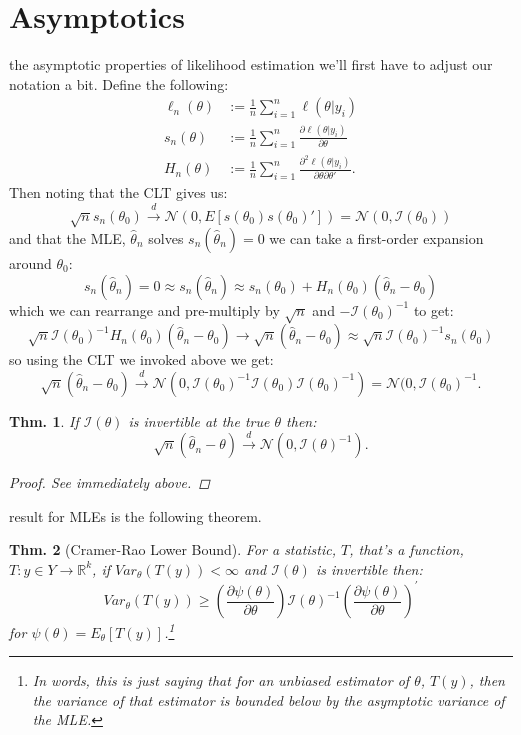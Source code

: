 \documentclass{tufte-book}
\theoremstyle{mytheoremstyle}
\newtheorem*{thm}{Thm.}
\theoremstyle{mylemstyle}
\theoremstyle{mydefstyle}
\begin{document}
\section{Asymptotics}
 the asymptotic properties of likelihood estimation we'll first have to adjust our notation a bit. Define the following:
	\begin{align*}
		\ell_n(\theta)& := \frac{1}{n} \sum_{i=1}^n \ell(\theta | y_i) \\
		s_n(\theta)& := \frac{1}{n} \sum_{i=1}^n \frac{\partial \ell(\theta | y_i)}{\partial \theta} \\
		H_n(\theta)& := \frac{1}{n} \sum_{i=1}^n \frac{\partial^2 \ell(\theta | y_i)}{\partial \theta \partial \theta'} \text{.}
	\end{align*}
Then noting that the CLT gives us:
	\[\sqrt{n}s_n(\theta_0) \overset{d}{\rightarrow} \mathcal{N}(0, E[s(\theta_0)s(\theta_0)']) = \mathcal{N}(0, \mathcal{I}(\theta_0))\]
and that the MLE, \(\hat{\theta}_n\) solves \(s_n(\hat{\theta}_n) = 0\) we can take a first-order expansion around \(\theta_0\):
	\[s_n(\hat{\theta}_n) = 0 \approx s_n(\hat{\theta}_n) \approx s_n(\theta_0) + H_n(\theta_0)(\hat{\theta}_n - \theta_0)\]
which we can rearrange and pre-multiply by \(\sqrt{n}\) and \(-\mathcal{I}(\theta_0)^{-1}\) to get:
	\[\sqrt{n}\mathcal{I}(\theta_0)^{-1}H_n(\theta_0)(\hat{\theta}_n - \theta_0)\rightarrow \sqrt{n}(\hat{\theta}_n - \theta_0) \approx \sqrt{n}\mathcal{I}(\theta_0)^{-1}s_n(\theta_0) \]
so using the CLT we invoked above we get:
	\[\sqrt{n}(\hat{\theta}_n - \theta_0) \overset{d}{\rightarrow} \mathcal{N}(0, \mathcal{I}(\theta_0)^{-1}\mathcal{I}(\theta_0)\mathcal{I}(\theta_0)^{-1}) = \mathcal{N}(0, \mathcal{I}(\theta_0)^{-1} \text{.}\]
\begin{thm} If \(\mathcal{I}(\theta)\) is invertible at the true \(\theta\) then:
	\[\sqrt{n}(\hat{\theta}_n - \theta) \overset{d}{\rightarrow} \mathcal{N}(0, \mathcal{I}(\theta)^{-1}) \text{.}\]
	\begin{proof} See immediately above.
	\end{proof}
\end{thm}

 result for MLEs is the following theorem.
\begin{thm}[Cramer-Rao Lower Bound] For a statistic, \(T\), that's a function, \(T: y\in Y \rightarrow \mathbb{R}^k\), if \(Var_\theta (T(y)) < \infty\) and \(\mathcal{I}(\theta)\) is invertible then:
	\[Var_\theta (T(y)) \ge \left(\frac{\partial \psi(\theta)}{\partial \theta} \right) \mathcal{I}(\theta)^{-1} \left(\frac{\partial \psi(\theta)}{\partial \theta}\right)^{'}\]
for \(\psi(\theta) = E_\theta[T(y)]\).\footnote{In words, this is just saying that for an unbiased estimator of \(\theta\), \(T(y)\), then the variance of that estimator is bounded below by the asymptotic variance of the MLE.} 
\end{thm}
\end{document}
